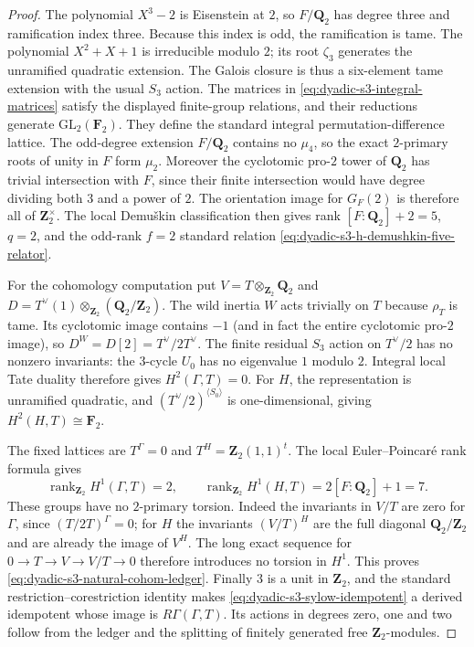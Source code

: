 \documentclass[11pt]{article}
\theoremstyle{definition}
\begin{document}
\begin{proof}
The polynomial $X^3-2$ is Eisenstein
at $2$, so $F/\mathbf Q_2$ has degree
three and ramification index three.
Because this index is odd, the
ramification is tame.  The polynomial
$X^2+X+1$ is irreducible modulo $2$;
its root $\zeta_3$ generates the
unramified quadratic extension.
The Galois closure is thus a
six-element tame extension with the
usual $S_3$ action.
The matrices in
\eqref{eq:dyadic-s3-integral-matrices}
satisfy the displayed finite-group
relations, and their reductions
generate $\mathrm{GL}_2(\mathbf F_2)$.
They define the standard integral
permutation-difference lattice.
The odd-degree extension $F/\mathbf Q_2$
contains no $\mu_4$, so the exact
$2$-primary roots of unity in $F$
form $\mu_2$.  Moreover the
cyclotomic pro-$2$ tower of
$\mathbf Q_2$ has trivial
intersection with $F$, since
their finite intersection would
have degree dividing both $3$
and a power of $2$.
The orientation image for $G_F(2)$
is therefore all of $\mathbf Z_2^\times$.
The local Demu\v{s}kin classification
then gives rank $[F:\mathbf Q_2]+2=5$,
$q=2$, and the odd-rank $f=2$
standard relation
\eqref{eq:dyadic-s3-h-demushkin-five-relator}.

For the cohomology computation put
$V=T\otimes_{\mathbf Z_2}\mathbf Q_2$ and
$D=T^\vee(1)\otimes_{\mathbf Z_2}
(\mathbf Q_2/\mathbf Z_2)$.
The wild inertia $W$ acts trivially
on $T$ because $\rho_T$ is tame.
Its cyclotomic image contains $-1$
(and in fact the entire cyclotomic
pro-$2$ image), so
$D^W=D[2]=T^\vee/2T^\vee$.
The finite residual $S_3$ action
on $T^\vee/2$ has no nonzero
invariants: the $3$-cycle $U_0$
has no eigenvalue $1$ modulo $2$.
Integral local Tate duality
therefore gives $H^2(\Gamma,T)=0$.
For $H$, the representation is
unramified quadratic, and
$(T^\vee/2)^{\langle S_0\rangle}$
is one-dimensional, giving
$H^2(H,T)\cong\mathbf F_2$.

The fixed lattices are
$T^\Gamma=0$ and
$T^H=\mathbf Z_2(1,1)^t$.
The local Euler--Poincar\'e rank
formula \cite{NSW} gives
\[
\operatorname{rank}_{\mathbf Z_2}H^1(\Gamma,T)=2,
\qquad
\operatorname{rank}_{\mathbf Z_2}H^1(H,T)=2[ F:\mathbf Q_2]+1=7.
\]
These groups have no $2$-primary
torsion.  Indeed the invariants in
$V/T$ are zero for $\Gamma$, since
$(T/2T)^\Gamma=0$; for $H$ the
invariants $(V/T)^H$ are the full
diagonal $\mathbf Q_2/\mathbf Z_2$
and are already the image of $V^H$.
The long exact sequence for
$0\to T\to V\to V/T\to0$
therefore introduces no torsion in
$H^1$.
This proves
\eqref{eq:dyadic-s3-natural-cohom-ledger}.
Finally $3$ is a unit in
$\mathbf Z_2$, and the standard
restriction--corestriction identity
makes \eqref{eq:dyadic-s3-sylow-idempotent}
a derived idempotent whose image is
$R\Gamma(\Gamma,T)$.
Its actions in degrees zero, one
and two follow from the ledger
and the splitting of finitely
generated free $\mathbf Z_2$-modules.
\end{proof}
\end{document}
